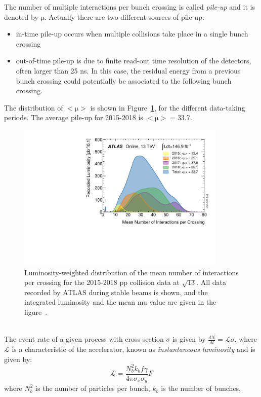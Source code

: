 The number of multiple interactions per bunch crossing is called \textit{pile-up} and it is denoted by $\mathrm{\mu}$. 
Actually there are two different sources of pile-up:
\begin{itemize}
	\item in-time pile-up occurs when multiple collisions take place in a single bunch crossing
	\item out-of-time pile-up is due to finite read-out time resolution of the detectors, often larger than 25 ns. In this case, the residual energy from
	a previous bunch crossing could potentially be associated to the following bunch crossing.
\end{itemize}
\newpage
\noindent The distribution of $\mathrm{<\mu>}$ is shown in Figure~\ref{fig:pileup}, for the different data-taking periods. The average pile-up for 2015-2018 is $\mathrm{<\mu>=33.7}$.
\begin{figure}[h]
	\centering
	\includegraphics[width=100mm]{Chapters/CH2/figures/mu_2015_2018}
	\caption{Luminosity-weighted distribution of the mean number of interactions per crossing for the 2015-2018 pp collision data at $\mathrm{\sqrt{13}}$.  All data recorded by ATLAS during stable beams is shown, and the integrated luminosity and the mean mu value are given in the figure~\cite{lumi}.}
	\label{fig:pileup}
\end{figure}
\\The event rate of a given process with cross section $\sigma$ is given by $\frac{dN}{dt}=\mathcal{L} \sigma$, where $\mathcal{L}$ is 
a characteristic of the accelerator, known as \textit{instantaneous luminosity} and is given by:
\begin{equation}
\mathcal{L} =  \frac{N^{2}_{b}k_{b}f\gamma}{4\pi\sigma_{x}\sigma_{y}}F
\end{equation}
where $N^{2}_{b}$ is the number of particles per bunch, 
$k_{b}$ is the number of bunches, 
